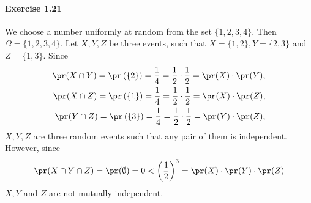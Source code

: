 \paragraph{Exercise 1.21} We choose a number uniformly at random from the set
$\{ 1, 2, 3, 4 \}$. Then $\Omega = \{ 1, 2, 3, 4 \}$. Let $X, Y, Z$ be three events,
such that $X = \{ 1, 2 \}, Y = \{ 2, 3 \}$ and $Z = \{ 1, 3 \}$. Since
\begin{align*}
  \pr(X \cap Y) = \pr\left(\{ 2 \}\right) = \frac{1}{4}
    = \frac{1}{2} \cdot \frac{1}{2} = \pr(X) \cdot \pr(Y), \\
  \pr(X \cap Z) = \pr\left(\{ 1 \}\right) = \frac{1}{4}
    = \frac{1}{2} \cdot \frac{1}{2} = \pr(X) \cdot \pr(Z), \\
  \pr(Y \cap Z) = \pr\left(\{ 3 \}\right) = \frac{1}{4}
    = \frac{1}{2} \cdot \frac{1}{2} = \pr(Y) \cdot \pr(Z),
\end{align*}
$X, Y, Z$ are three random events such that any pair of them is independent.
However, since
\[
  \pr(X \cap Y \cap Z) = \pr(\emptyset) = 0
    < \left(\frac{1}{2}\right)^3 = \pr(X) \cdot \pr(Y) \cdot \pr(Z)
\]
$X, Y$ and $Z$ are not mutually independent.

